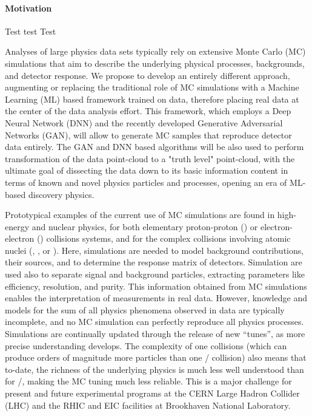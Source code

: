 \paragraph{Motivation}

Test test Test

Analyses of large physics data sets typically rely on extensive Monte Carlo (MC) simulations that aim to describe the underlying physical processes, backgrounds, and detector response. We propose to develop an entirely different  approach, augmenting or replacing the traditional role of MC simulations with a Machine Learning (ML) based framework trained on data, therefore placing real data at the center of the data analysis effort. This framework, which employs a Deep Neural Network (DNN) and the recently developed Generative Adversarial Networks (GAN), will allow to generate MC samples that reproduce detector data entirely. The GAN and DNN based algorithms will be also used to perform transformation of the data point-cloud to a "truth level" point-cloud, with the ultimate goal of dissecting the data down to its basic information content in terms of known and novel physics particles and processes, opening an era of ML-based discovery physics.

Prototypical examples of the current use of MC simulations are found in high-energy and nuclear physics, for both elementary proton-proton (\pp) or electron-electron (\eecol) collisions systems, and for the complex collisions involving atomic nuclei (\eA, \pA, or \aacol). Here, simulations are needed to model background contributions, their sources, and to determine the response matrix of detectors. Simulation are used also to separate signal and background particles, extracting parameters like efficiency, resolution, and purity. This information obtained from MC simulations enables the interpretation of  measurements in real data. However, knowledge and models for the sum of all physics phenomena observed in data are typically incomplete, and no MC simulation can perfectly reproduce all physics processes. Simulations are continually updated through the release of new ``tunes'', as more precise understanding develops. The complexity of one {\aacol} collisions (which can produce orders of magnitude more particles than one \eecol/{\pp} collision) also means that to-date, the richness of the underlying physics is much less well understood than for \eecol/{\pp}, making the MC tuning much less reliable. This is a major challenge for present and future experimental programs at the CERN Large Hadron Collider (LHC) and the RHIC and EIC facilities at Brookhaven National Laboratory.

